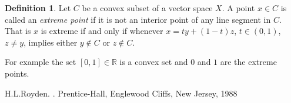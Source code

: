 \documentclass[12pt]{article}
\theoremstyle{theorem}
\theoremstyle{definition}
\newtheorem*{defn}{Definition}
\begin{document}
\begin{defn}
Let $C$ be a convex subset of a vector space $X$.  A point $x \in C$ is
called an {\em extreme point} if it is not an interior point of any line segment
in $C$.  That is $x$ is extreme if and only if whenever $x = ty +(1-t)z$, $t \in (0,1)$, $z \not= y$, implies either $y \notin C$ or $z \notin C$.
\end{defn}

For example the set $[0,1] \in {\mathbb{R}}$ is a convex set and $0$ and $1$ are the extreme points.

\begin{thebibliography}{9}
H.\@ L.\@ Royden. \emph{}. Prentice-Hall, Englewood Cliffs, New Jersey, 1988
\end{thebibliography}
\end{document}
